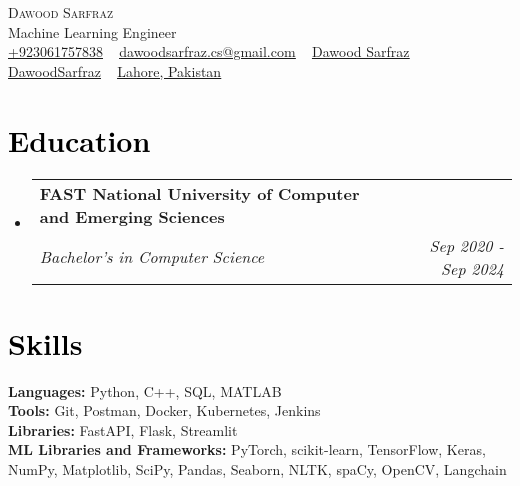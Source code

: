 \documentclass[letterpaper,11pt]{article}
\makeatletter
\newcommand{\resumeSubheading}[4]{
	\vspace{-2pt}\item
	\begin{tabular*}{1.0\textwidth}[t]{l@{\extracolsep{\fill}}r}
		\textbf{\large#1} & \textbf{\small #2} \\
		\textit{\large#3} & \textit{\small #4} \\
		
	\end{tabular*}\vspace{-7pt}
}
\newcommand{\resumeSubHeadingListStart}{\begin{itemize}[leftmargin=0.0in, label={}]}
\newcommand{\resumeSubHeadingListEnd}{\end{itemize}}
\makeatother
\begin{document}
	
	
	
	\begin{center}
		{\Huge \scshape Dawood Sarfraz} \\ \vspace{2pt}
		{\Large{Machine Learning Engineer}} \\ \vspace{2pt}
		\small 
		\href{tel:+9203061757838}{\raisebox{-0.1\height}{\faPhone} \underline{{+923061757838}}} ~ 
		\href{mailto:dawoodsarfraz.cs@gmail.com}{\raisebox{-0.2\height}{\faEnvelope} \underline{{dawoodsarfraz.cs@gmail.com}}} ~ 
		\href{https://linkedin.com/in/dawood-sarfraz-0466541b6}{\raisebox{-0.2\height}{\faLinkedin}  \underline{{Dawood Sarfraz}}} ~
		\href{https://daudsarfraz.github.io/DawoodSarfraz/}{\raisebox{-0.2\height}{\faGlobe} \underline{{DawoodSarfraz}}}
		~ 
		\href{https://maps.app.goo.gl/DdjDSuGCuwkG288CA}{ \underline{{Lahore, Pakistan}}} 
		\vspace{-5pt}
	\end{center}
	
	
	\section{\textcolor{black}{Education}}
	\resumeSubHeadingListStart
	\resumeSubheading
	{FAST National University of Computer and Emerging Sciences}{}
	{Bachelor's in Computer Science }{Sep 2020 - Sep 2024}
	\resumeSubHeadingListEnd
	\vspace{-12pt}

	\section{\textcolor{black}{Skills}}
	\begin{itemize}[leftmargin=0.01in, label={}]
		{\item{
				\textbf{\normalsize{Languages:}}{ \normalsize{Python, C++, SQL, MATLAB}} \\
				\textbf{\normalsize{Tools:}}{ \normalsize{Git, Postman, Docker, Kubernetes, Jenkins}} \\	
				\textbf{\normalsize{Libraries:}}{ \normalsize{FastAPI, Flask, Streamlit}}\\	
				\textbf{\normalsize{ML Libraries and Frameworks:}}{ \normalsize{PyTorch, scikit-learn, TensorFlow, Keras, NumPy, Matplotlib, SciPy, Pandas, Seaborn, NLTK, spaCy, OpenCV, Langchain}} \\
		}}
	\end{itemize}
	\vspace{-18pt}
	
\end{document}
